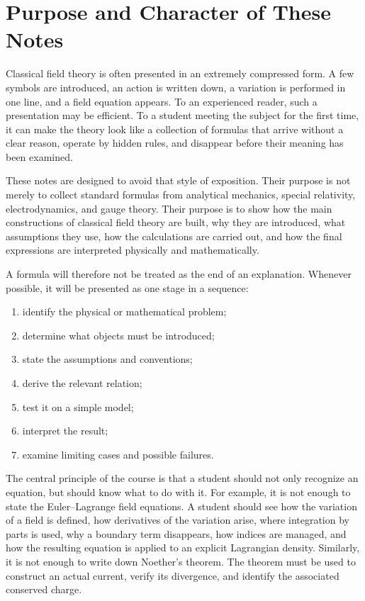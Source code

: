 \section*{Purpose and Character of These Notes}

Classical field theory is often presented in an extremely compressed form. A few symbols are introduced, an action is written down, a variation is performed in one line, and a field equation appears. To an experienced reader, such a presentation may be efficient. To a student meeting the subject for the first time, it can make the theory look like a collection of formulas that arrive without a clear reason, operate by hidden rules, and disappear before their meaning has been examined.

These notes are designed to avoid that style of exposition. Their purpose is not merely to collect standard formulas from analytical mechanics, special relativity, electrodynamics, and gauge theory. Their purpose is to show how the main constructions of classical field theory are built, why they are introduced, what assumptions they use, how the calculations are carried out, and how the final expressions are interpreted physically and mathematically.

A formula will therefore not be treated as the end of an explanation. Whenever possible, it will be presented as one stage in a sequence:

\begin{enumerate}
    \item identify the physical or mathematical problem;
    \item determine what objects must be introduced;
    \item state the assumptions and conventions;
    \item derive the relevant relation;
    \item test it on a simple model;
    \item interpret the result;
    \item examine limiting cases and possible failures.
\end{enumerate}

The central principle of the course is that a student should not only recognize an equation, but should know what to do with it. For example, it is not enough to state the Euler--Lagrange field equations. A student should see how the variation of a field is defined, how derivatives of the variation arise, where integration by parts is used, why a boundary term disappears, how indices are managed, and how the resulting equation is applied to an explicit Lagrangian density. Similarly, it is not enough to write down Noether's theorem. The theorem must be used to construct an actual current, verify its divergence, and identify the associated conserved charge.

